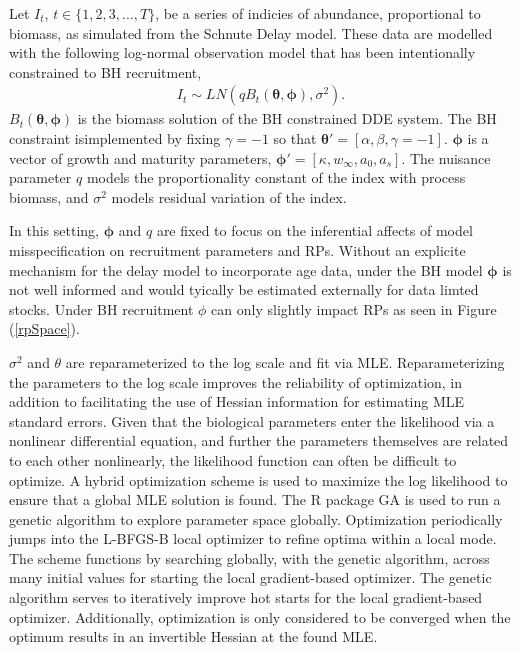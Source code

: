 %
Let $I_t$, $t\in\{1,2,3,...,T\}$, be a series of indicies of abundance, 
proportional to biomass, as simulated from the Schnute Delay model. These data 
are modelled with the following log-normal observation model that has been 
intentionally constrained to BH recruitment,
%
\begin{align}
I_t \sim LN(q B_t(\bm{\theta}, \bm{\phi}), \sigma^2). \label{bL}
\end{align}
%
$B_t(\bm{\theta}, \bm{\phi})$ is the biomass solution of the BH constrained DDE system. %
The BH constraint isimplemented by fixing $\gamma=-1$ so that $\bm{\theta}'=[\alpha, \beta, \gamma=-1]$. 
$\bm{\phi}$ is a vector of growth and maturity parameters, 
$\bm{\phi}'=[\kappa, w_\infty, a_0, a_s]$. The nuisance parameter $q$ models 
the proportionality constant of the index with process biomass, and $\sigma^2$ 
models residual variation of the index.  

%
In this setting, $\bm{\phi}$ and $q$ are fixed %
to focus on the inferential affects of model misspecification on recruitment 
parameters and RPs. Without an explicite mechanism for the delay model to incorporate 
age data, under the BH model $\bm{\phi}$ is not well informed and would 
tyically be estimated externally for data limted stocks. Under BH recruitment 
$\phi$ can only slightly impact RPs as seen in Figure (\ref{rpSpace}). 

%
$\sigma^2$ and $\theta$ are reparameterized to the log scale and fit via MLE. 
Reparameterizing the parameters to the log scale improves the reliability of 
optimization, in addition to facilitating the use of Hessian information for 
estimating MLE standard errors. Given that the biological parameters enter the 
likelihood via a nonlinear differential equation, and further the parameters 
themselves are related to each other nonlinearly, the likelihood function can 
often be difficult to optimize. A hybrid optimization scheme is used to 
maximize the log likelihood to ensure that a global MLE solution is found. The 
R package GA  is used to 
run a genetic algorithm to explore parameter space globally. Optimization 
periodically jumps into the L-BFGS-B local optimizer to refine optima within a 
local mode. The scheme functions by searching globally, with the genetic 
algorithm, across many initial values for starting the local gradient-based 
optimizer. The genetic algorithm serves to iteratively improve hot starts for 
the local gradient-based optimizer. Additionally, optimization is only 
considered to be converged when the optimum results in an invertible Hessian at 
the found MLE.


